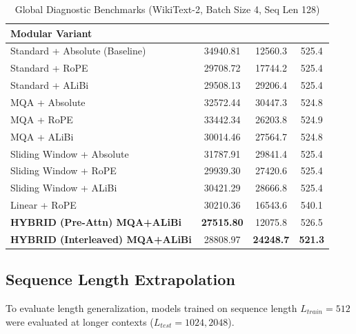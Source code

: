 \documentclass[11pt,a4paper]{article}
\begin{document}
\begin{table}[h]
    \centering
    \caption{Global Diagnostic Benchmarks (WikiText-2, Batch Size 4, Seq Len 128)}
    \begin{tabular*}{\textwidth}{@{\extracolsep{\fill}}l S[table-format=5.2] S[table-format=5.1] S[table-format=3.1] @{}}
        \toprule
        \textbf{Modular Variant} & {} & {} & {} \\
        \midrule
        Standard + Absolute (Baseline) & 34940.81 & 12560.3 & 525.4 \\
        Standard + RoPE               & 29708.72 & 17744.2 & 525.4 \\
        Standard + ALiBi              & 29508.13 & 29206.4 & 525.4 \\
        \midrule
        MQA + Absolute                & 32572.44 & 30447.3 & 524.8 \\
        MQA + RoPE                    & 33442.34 & 26203.8 & 524.9 \\
        MQA + ALiBi                   & 30014.46 & 27564.7 & 524.8 \\
        \midrule
        Sliding Window + Absolute     & 31787.91 & 29841.4 & 525.4 \\
        Sliding Window + RoPE         & 29939.30 & 27420.6 & 525.4 \\
        Sliding Window + ALiBi        & 30421.29 & 28666.8 & 525.4 \\
        \midrule
        Linear + RoPE                 & 30210.36 & 16543.6 & 540.1 \\
        \midrule
        \textbf{HYBRID (Pre-Attn) MQA+ALiBi} & \textbf{27515.80} & 12075.8 & 526.5 \\
        \textbf{HYBRID (Interleaved) MQA+ALiBi} & 28808.97 & \textbf{24248.7} & \textbf{521.3} \\
        \bottomrule
    \end{tabular*}
    \label{tab:global_diagnostics}
\end{table}

\subsection{Sequence Length Extrapolation}
To evaluate length generalization, models trained on sequence length $L_{train}=512$ were evaluated at longer contexts ($L_{test}=1024, 2048$).
\end{document}
